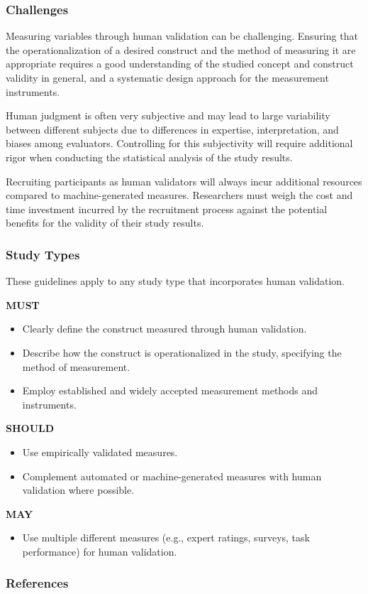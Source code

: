\documentclass[11pt]{article}
\begin{document}
\subsubsection{Challenges}

Measuring variables through human validation can be challenging.
Ensuring that the operationalization of a desired construct and the method of measuring it are appropriate requires a good understanding of the studied concept and construct validity in general, and a systematic design approach for the measurement instruments.

Human judgment is often very subjective and may lead to large variability between different subjects due to differences in expertise, interpretation, and biases among evaluators.
Controlling for this subjectivity will require additional rigor when conducting the statistical analysis of the study results.

Recruiting participants as human validators will always incur additional resources compared to machine-generated measures.
Researchers must weigh the cost and time investment incurred by the recruitment process against the potential benefits for the validity of their study results.

\subsubsection{Study Types}

These guidelines apply to any study type that incorporates human validation.

\textbf{MUST}
\begin{itemize}
    \item Clearly define the construct measured through human validation.
    \item Describe how the construct is operationalized in the study, specifying the method of measurement.
    \item Employ established and widely accepted measurement methods and instruments.
\end{itemize}

\textbf{SHOULD}
\begin{itemize}
    \item Use empirically validated measures.
    \item Complement automated or machine-generated measures with human validation where possible.
\end{itemize}

\textbf{MAY}
\begin{itemize}
    \item Use multiple different measures (e.g., expert ratings, surveys, task performance) for human validation.
\end{itemize}

\subsubsection{References}



\end{document}
